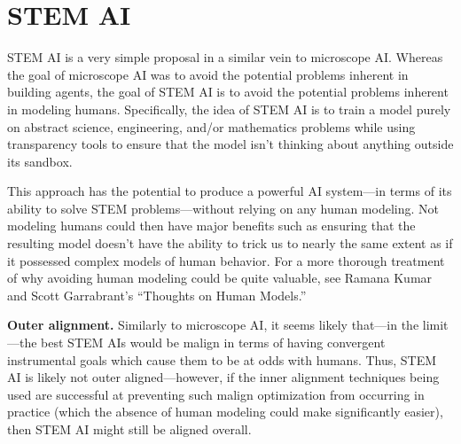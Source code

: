 \documentclass[
  onecolumn,
  natbib,
]{miri-tech-article}
\begin{document}
\section{STEM AI}
\label{sec:6}

STEM AI is a very simple proposal in a similar vein to microscope AI. Whereas the goal of microscope AI was to avoid the potential problems inherent in building agents, the goal of STEM AI is to avoid the potential problems inherent in modeling humans. Specifically, the idea of STEM AI is to train a model purely on abstract science, engineering, and/or mathematics problems while using transparency tools to ensure that the model isn't thinking about anything outside its sandbox.

This approach has the potential to produce a powerful AI system---in terms of its ability to solve STEM problems---without relying on any human modeling. Not modeling humans could then have major benefits such as ensuring that the resulting model doesn't have the ability to trick us to nearly the same extent as if it possessed complex models of human behavior. For a more thorough treatment of why avoiding human modeling could be quite valuable, see Ramana Kumar and Scott Garrabrant's ``Thoughts on Human Models\cite{TODO: cite https://www.alignmentforum.org/posts/BKjJJH2cRpJcAnP7T/thoughts-on-human-models}.''

\textbf{Outer alignment.} Similarly to microscope AI, it seems likely that---in the limit---the best STEM AIs would be malign in terms of having convergent instrumental goals which cause them to be at odds with humans. Thus, STEM AI is likely not outer aligned---however, if the inner alignment techniques being used are successful at preventing such malign optimization from occurring in practice (which the absence of human modeling could make significantly easier), then STEM AI might still be aligned overall.
\end{document}
